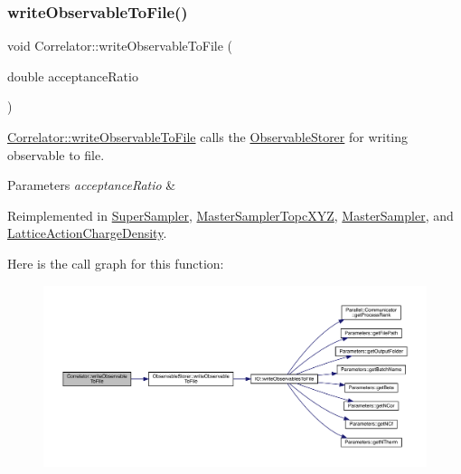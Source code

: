 \subsubsection{\texorpdfstring{writeObservableToFile()}{writeObservableToFile()}}
{\footnotesize\ttfamily void Correlator\+::write\+Observable\+To\+File (\begin{DoxyParamCaption}\item[{double}]{acceptance\+Ratio }\end{DoxyParamCaption})\hspace{0.3cm}{\ttfamily [virtual]}}



\mbox{\hyperlink{class_correlator_a9e8d80e30e4fbe3b7fe57521538cb5ff}{Correlator\+::write\+Observable\+To\+File}} calls the \mbox{\hyperlink{class_observable_storer}{Observable\+Storer}} for writing observable to file. 


\begin{DoxyParams}{Parameters}
{\em acceptance\+Ratio} & \\
\hline
\end{DoxyParams}


Reimplemented in \mbox{\hyperlink{class_super_sampler_a05b42b82879233dc329d280a61bfd7f0}{Super\+Sampler}}, \mbox{\hyperlink{class_master_sampler_topc_x_y_z_a930f13a2a13f4b3820f40c8b52110cf2}{Master\+Sampler\+Topc\+X\+YZ}}, \mbox{\hyperlink{class_master_sampler_a638714c38e1a6252ab8b6be1fa224bd4}{Master\+Sampler}}, and \mbox{\hyperlink{class_lattice_action_charge_density_a719f71aaccbf1b4147ea944781d69908}{Lattice\+Action\+Charge\+Density}}.

Here is the call graph for this function\+:\nopagebreak
\begin{figure}[H]
\begin{center}
\leavevmode
\includegraphics[width=350pt]{class_correlator_a9e8d80e30e4fbe3b7fe57521538cb5ff_cgraph}
\end{center}
\end{figure}


